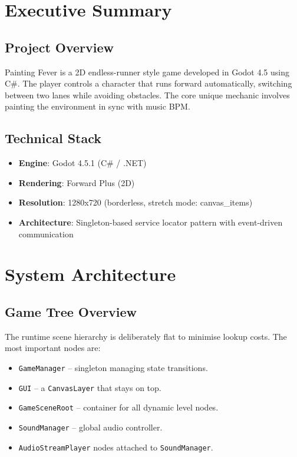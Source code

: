 \documentclass{report}
\begin{document}
\tableofcontents
\newpage

\chapter{Executive Summary}
\section{Project Overview}
Painting Fever is a 2D endless-runner style game developed in Godot 4.5 using C\#. The player controls a character that runs forward automatically, switching between two lanes while avoiding obstacles. The core unique mechanic involves painting the environment in sync with music BPM.

\section{Technical Stack}
\begin{itemize}[noitemsep]
	\item \textbf{Engine}: Godot 4.5.1 (C\# / .NET)
	\item \textbf{Rendering}: Forward Plus (2D)
	\item \textbf{Resolution}: 1280x720 (borderless, stretch mode: canvas\_items)
	\item \textbf{Architecture}: Singleton-based service locator pattern with event-driven communication
\end{itemize}

\chapter{System Architecture}
\section{Game Tree Overview}
The runtime scene hierarchy is deliberately flat to minimise lookup costs. The most important nodes are:
\begin{itemize}[noitemsep]
	\item \texttt{GameManager} – singleton managing state transitions.
	\item \texttt{GUI} – a \texttt{CanvasLayer} that stays on top.
	\item \texttt{GameSceneRoot} – container for all dynamic level nodes.
	\item \texttt{SoundManager} – global audio controller.
	\item \texttt{AudioStreamPlayer} nodes attached to \texttt{SoundManager}.
\end{itemize}
\end{document}
